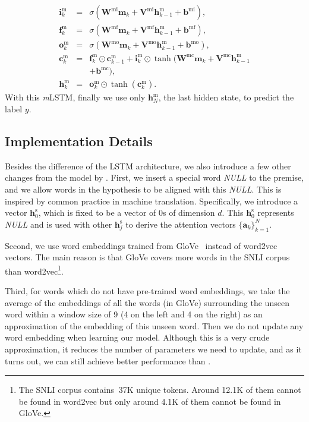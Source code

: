 \documentclass[11pt,letterpaper]{article}
\begin{document}
\small
\begin{eqnarray}
\nonumber
\mathbf{i}^\text{m}_k & = & \sigma(\mathbf{W}^\text{mi} \mathbf{m}_k + \mathbf{V}^\text{mi} \mathbf{h}^\text{m}_{k-1} + \mathbf{b}^\text{mi}), \\
\nonumber
\mathbf{f}^\text{m}_k & = & \sigma(\mathbf{W}^\text{mf} \mathbf{m}_k + \mathbf{V}^\text{mf} \mathbf{h}^\text{m}_{k-1} + \mathbf{b}^\text{mf}), \\
\nonumber
\mathbf{o}^\text{m}_k & = & \sigma(\mathbf{W}^\text{mo} \mathbf{m}_k + \mathbf{V}^\text{mo} \mathbf{h}^\text{m}_{k-1} + \mathbf{b}^\text{mo}), \\
\nonumber
\mathbf{c}^\text{m}_k & = & \mathbf{f}^\text{m}_k \odot \mathbf{c}^\text{m}_{k-1} + \mathbf{i}^\text{m}_k \odot \tanh(\mathbf{W}^\text{mc} \mathbf{m}_k + \mathbf{V}^\text{mc} \mathbf{h}^\text{m}_{k-1} \\
\nonumber
& & + \mathbf{b}^\text{mc}), \\
\mathbf{h}^\text{m}_k & = & \mathbf{o}^\text{m}_k \odot \tanh(\mathbf{c}^\text{m}_k).
\end{eqnarray}
\normalsize
With this \emph{m}LSTM, finally we use only $\mathbf{h}^\text{m}_N$, the last hidden state, to predict the label $y$.


\subsection{Implementation Details}
\label{subsec:details}

Besides the difference of the LSTM architecture, we also introduce a few other changes from the model by .
First, we insert a special word \emph{NULL} to the premise, and we allow words in the hypothesis to be aligned with this \emph{NULL}.
This is inspired by common practice in machine translation.
Specifically, we introduce a vector $\mathbf{h}^\text{s}_0$, which is fixed to be a vector of 0s of dimension $d$.
This $\mathbf{h}^\text{s}_0$ represents \emph{NULL} and is used with other $\mathbf{h}^\text{s}_j$ to derive the attention vectors $\{\mathbf{a}_k\}_{k=1}^N$.

Second, we use word embeddings trained from GloVe~\cite{pennington:emnlp14} instead of word2vec vectors.
The main reason is that GloVe covers more words in the SNLI corpus than word2vec\footnote{The SNLI corpus contains $~$37K unique tokens. Around 12.1K of them cannot be found in word2vec but only around 4.1K of them cannot be found in GloVe.}.

Third, for words which do not have pre-trained word embeddings, we take the average of the embeddings of all the words (in GloVe) surrounding the unseen word within a window size of 9 (4 on the left and 4 on the right) as an approximation of the embedding of this unseen word.
Then we do not update any word embedding when learning our model.
Although this is a very crude approximation, it reduces the number of parameters we need to update, and as it turns out, we can still achieve better performance than .
\end{document}
